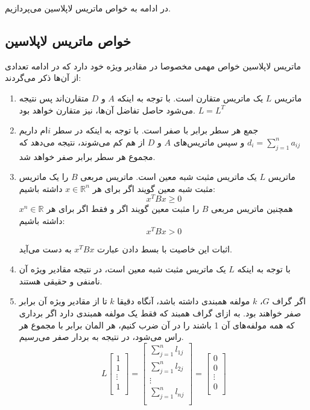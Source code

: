 در ادامه به خواص ماتریس لاپلاسین می‌پردازیم.

\subsection{خواص ماتریس لاپلاسین}\label{sec laplacian properties}
ماتریس لاپلاسین خواص مهمی مخصوصا در مقادیر ویژه خود دارد که در ادامه تعدادی از آن‌ها ذکر می‌گردند:
\begin{enumerate}
	\item 
	ماتریس $L$ یک ماتریس متقارن است. با توجه به اینکه $A$ و $D$ متقارن‌اند پس نتیجه می‌شود حاصل تفاضل آن‌ها، نیز متقارن خواهد بود. $L = L^T$
	\item 
	جمع هر سطر برابر با صفر است. با توجه به اینکه در سطر $i$ام داریم 
$d_i = \sum_{j=1}^{n} a_{ij}$
و سپس ماتریس‌های $A$ و $D$ از هم کم می‌شوند، نتیجه می‌دهد که مجموع هر سطر برابر صفر خواهد شد.
	\item 
	ماتریس $L$ یک ماتریس مثبت شبه معین است. ماتریس مربعی $B$ را یک ماتریس مثبت شبه معین گویند اگر برای هر $x \in \mathbb{R}^n$ داشته باشیم:
	\begin{equation}
		x^TBx \ge 0
	\end{equation}
همچنین ماتریس مربعی $B$ را مثبت معین گویند اگر و فقط اگر برای هر $x ^n\in \mathbb{R}$ داشته باشیم:
\begin{equation}
	x^TBx > 0
\end{equation}

اثبات این خاصیت با بسط دادن عبارت $x^TBx$ به دست می‌آید.

	\item 
	با توجه به اینکه $L$ یک ماتریس مثبت شبه معین است، در نتیجه مقادیر ویژه آن نامنفی و حقیقی هستند.
	
	\item
	اگر گراف $G$، $k$ مولفه همبندی داشته باشد، آنگاه دقیقا $k$ تا از مقادیر ویژه آن برابر صفر خواهند بود. به ازای گراف همبند که فقط یک مولفه همبندی دارد اگر برداری که همه مولفه‌های آن 1 باشند را در آن ضرب کنیم، هر المان برابر با مجموع هر راس می‌شود، در نتیجه به بردار صفر می‌رسیم.
\begin{equation}\label{eq L1 = 0}
	L
	\begin{bmatrix}
	1 \\
	1 \\
	\vdots \\
	1 \\
	\end{bmatrix}
	= 
	\begin{bmatrix}
	\sum_{j=1}^{n} l_{1j} \\
	\sum_{j=1}^{n} l_{2j} \\
	\vdots \\
	\sum_{j=1}^{n} l_{nj} \\
	\end{bmatrix}
	= 
	\begin{bmatrix}
	0 \\
	0 \\
	\vdots \\
	0 \\
	\end{bmatrix}
\end{equation}


\end{enumerate}
